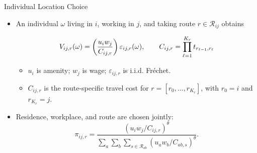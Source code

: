 \documentclass[11pt,aspectratio=169]{beamer}
\newcommand{\R}{\mathcal{R}}
\begin{document}
\begin{frame}{Individual Location Choice}
\begin{itemize}\small\setlength\itemsep{0.75em}
  \item An individual $\omega$ living in $i$, working in $j$, and taking route $r\in\R_{ij}$ obtains
  \vspace{-0.10em}\begin{footnotesize}\begin{equation}\label{eq:routecost}
    V_{ij,r}(\omega) = \left( \frac{u_i w_j}{C_{ij,r}} \right)\varepsilon_{ij,r}(\omega),
    \qquad
    C_{ij,r} = \prod_{\ell=1}^{K_r} t_{r_{\ell-1},r_\ell}
  \vspace{-0.35em}\end{equation}\end{footnotesize}
  \begin{itemize}\footnotesize\setlength\itemsep{0.30em}
    \item $u_i$ is amenity; $w_j$ is wage; $\varepsilon_{ij,r}$ is i.i.d. Fr\'echet.
    \item $C_{ij,r}$ is the route-specific travel cost for $r=[r_0,\ldots,r_{K_r}]$, with $r_0=i$ and $r_{K_r}=j$.
  \end{itemize}
  \vspace{0.55em}
  \item Residence, workplace, and route are chosen jointly:
  \vspace{-0.10em}\begin{equation}\label{eq:pi}
    \pi_{ij,r} = \frac{\left(u_i w_j/C_{ij,r}\right)^\theta}{\sum_{a}\sum_b\sum_{s\in\R_{ab}}\left(u_a w_b/C_{ab,s}\right)^\theta}.
  \end{equation}
\end{itemize}
\end{frame}
\end{document}
